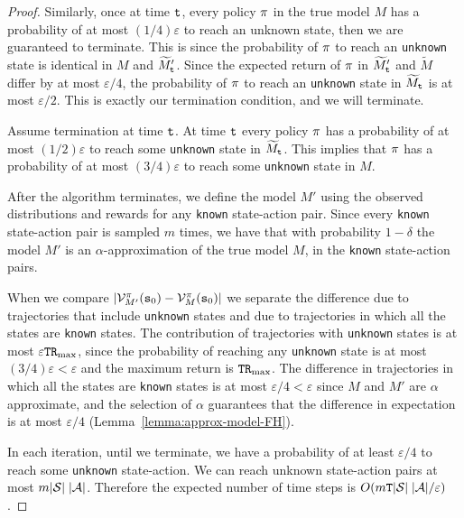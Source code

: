 \begin{proof}
Similarly, once at time ${\tt t}$, every policy $\pi$ in the true
model $M$ has a probability of at most $(1/4)\varepsilon$ to reach an
unknown state, then we are guaranteed to terminate. This is since the
probability of $\pi$ to reach an \texttt{unknown} state is identical in
$M$ and $\widetilde{M}'_{\tt t}$. Since the expected return of $\pi$
in $\widetilde{M}'_{\tt t}$ and $\widetilde{M}$ differ by at most
$\varepsilon/4$, the probability of $\pi$ to reach an \texttt{unknown}
state in $\widetilde{M}_{\tt t}$ is at most $\varepsilon/2$. This is
exactly our termination condition, and we will terminate.
%



Assume termination at time ${\tt t}$. At time ${\tt t}$ every policy
$\pi$ has a probability of at most $(1/2)\varepsilon$ to reach
some \texttt{unknown} state in $\widetilde{M}_{\tt t}$. This implies that
$\pi$ has a probability of at most $(3/4)\varepsilon$ to reach
some \texttt{unknown} state in $M$.



After the algorithm terminates, we define the model $M'$ using the
observed distributions and rewards for any \texttt{known} state-action pair.
Since every \texttt{known} state-action pair is sampled $m$ times, we have
that with probability $1-\delta$ the model $M'$
is an $\alpha$-approximation of the true model $M$, in the \texttt{known}
state-action pairs.

When we compare
$|\mathcal{V}^\pi_{M'}({\tt s}_0)-\mathcal{V}^\pi_M({\tt s}_0)|$ we
separate the difference due to trajectories that include \texttt{unknown} states and due to trajectories in which all the states are \texttt{known} states. 
The contribution of trajectories with  \texttt{unknown} states is at most $\varepsilon{\tt T}{\tt R}_{\max }$,
since the probability of reaching any \texttt{unknown} state is at most
$(3/4)\varepsilon<\varepsilon$ and the maximum return is
${\tt T}{\tt R}_{\max }$. The difference in trajectories in which all the states are \texttt{known} states is at most
$\varepsilon/4<\varepsilon$ since $M$ and $M'$ are $\alpha$
approximate, and the selection of $\alpha$ guarantees that the
difference in expectation is at most $\varepsilon/4$
(Lemma~\ref{lemma:approx-model-FH}).

In each iteration, until we terminate, we have a probability of at
least $\varepsilon/4$ to reach some \texttt{unknown} state-action. We can reach
unknown state-action pairs at most $m |\mathcal{S}|\;|\mathcal{A}|$.
Therefore the expected number of time steps is  $O(m{\tt T}
|\mathcal{S}|\;|\mathcal{A}|/\varepsilon)$.
\end{proof}

